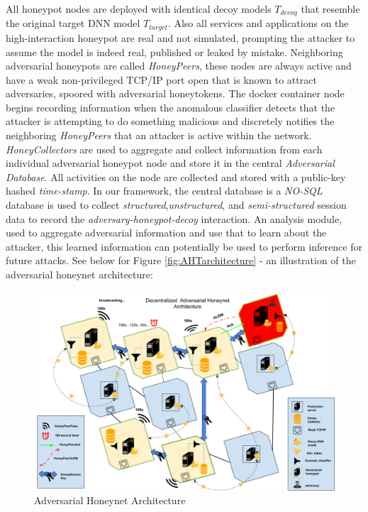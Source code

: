 \documentclass[grad,lot,lof,11pt,oneside,onehalfspace]{RUthesis}
\begin{document}
All honeypot nodes are deployed with identical decoy models \textit{$T_{decoy}$} that resemble the original target DNN model \textit{$T_{target}$}. Also all services and applications on the high-interaction honeypot are real and not simulated, prompting the attacker to assume the model is indeed real, published or leaked by mistake. Neighboring adversarial honeypots are called \textit{HoneyPeers}, these nodes are always active and have a weak non-privileged TCP/IP port open that is known to attract adversaries, spoored with adversarial honeytokens. The docker container node begins recording information when the anomalous classifier detects that the attacker is attempting to do something malicious and discretely notifies the neighboring \textit{HoneyPeers} that an attacker is active within the network. \textit{HoneyCollectors} are used to aggregate and collect information from each individual adversarial honeypot node and store it in the central \textit{Adversarial Database}. All activities on the node are collected and stored with a public-key hashed \textit{time-stamp}. In our framework, the central database is a \textit{NO-SQL} database is used to collect \textit{structured},\textit{unstructured}, and \textit{semi-structured} session data to record the \textit{adversary-honeypot-decoy} interaction. An analysis module, used to aggregate adversarial information and use that to learn about the attacker, this learned information can potentially be used to perform inference for future attacks. See below for Figure \ref{fig:AHTarchitecture} - an illustration of the adversarial honeynet architecture:
\begin{figure}[h]
\centering
\includegraphics[width=1.0\linewidth]{"Images/Chapter 4/HoneynetArchitecture"}
\caption{Adversarial Honeynet Architecture}
\label{fig:HoneynetArchitecture}
\end{figure}
\end{document}
